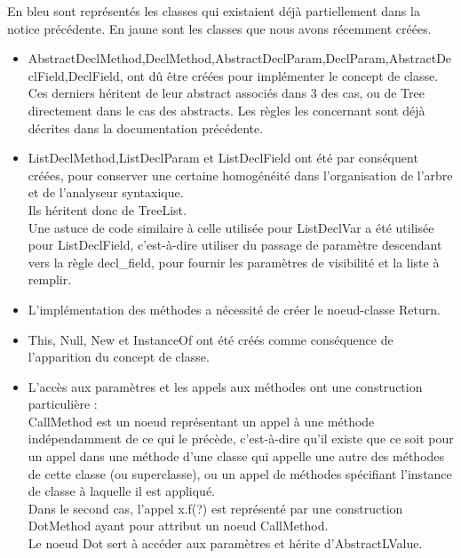 \documentclass[a4paper]{article}
\begin{document}
En bleu sont représentés les classes qui existaient déjà partiellement dans la notice précédente. En jaune sont les classes que nous avons récemment créées.\\
\begin{itemize}
\item AbstractDeclMethod,DeclMethod,AbstractDeclParam,DeclParam,AbstractDeclField,DeclField, ont dû être créées pour implémenter le concept de classe.\\
Ces derniers héritent de leur abstract associés dans 3 des cas, ou de Tree directement dans le cas des abstracts. Les règles les concernant sont déjà décrites dans la documentation précédente.\\

\item ListDeclMethod,ListDeclParam et ListDeclField ont été par conséquent créées, pour conserver une certaine homogénéité dans l'organisation de l'arbre et de l'analyseur syntaxique.\\
Ils héritent donc de TreeList.\\
Une astuce de code similaire à celle utilisée pour ListDeclVar a été utilisée pour ListDeclField, c'est-à-dire utiliser du passage de paramètre descendant vers la règle decl\_field, pour fournir les paramètres de visibilité et la liste à remplir.\\

\item L'implémentation des méthodes a nécessité de créer le noeud-classe Return.\\

\item This, Null, New et InstanceOf ont été créés comme conséquence de l'apparition du concept de classe.\\

\item L'accès aux paramètres et les appels aux méthodes ont une construction particulière :\\
CallMethod est un noeud représentant un appel à une méthode indépendamment de ce qui le précède, c'est-à-dire qu'il existe que ce soit pour un appel dans une méthode d'une classe qui appelle une autre des méthodes de cette classe (ou superclasse), ou un appel de méthodes spécifiant l'instance de classe à laquelle il est appliqué.\\
Dans le second cas, l'appel x.f(?) est représenté par une construction DotMethod ayant pour attribut un noeud CallMethod.\\
Le noeud Dot sert à accéder aux paramètres et hérite d'AbstractLValue.\\

\end{itemize}
\end{document}
